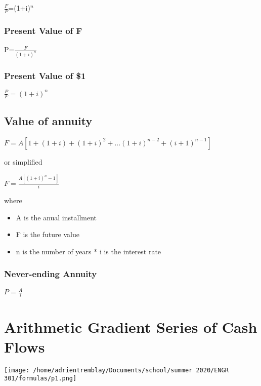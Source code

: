 \documentclass[]{article}
\providecommand{\tightlist}{%
  \setlength{\itemsep}{0pt}\setlength{\parskip}{0pt}}
\begin{document}
\(\frac{F}{P}\)=(1+i)\(^{n}\)

\hypertarget{present-value-of-f}{%
\subsubsection{Present Value of F}\label{present-value-of-f}}

P=\(\frac{F}{(1+i)^{n}}\)

\hypertarget{present-value-of-1}{%
\subsubsection{Present Value of \$1}\label{present-value-of-1}}

\(\frac{P}{F}=(1+i)^{n}\)

\hypertarget{value-of-annuity}{%
\subsection{Value of annuity}\label{value-of-annuity}}

\(F = A[1+(1+i)+(1+i)^{2} + ...(1+i)^{n-2}+(i+1)^{n-1}]\)

or simplified

\(F=\frac{A[(1+i)^{n}-1]}{i}\)

where

\begin{itemize}
\tightlist
\item
  A is the anual installment
\item
  F is the future value
\item
  n is the number of years * i is the interest rate
\end{itemize}

\hypertarget{never-ending-annuity}{%
\subsubsection{Never-ending Annuity}\label{never-ending-annuity}}

\(P=\frac{A}{i}\)

\hypertarget{arithmetic-gradient-series-of-cash-flows}{%
\section{Arithmetic Gradient Series of Cash
Flows}\label{arithmetic-gradient-series-of-cash-flows}}

\texttt{[image: /home/adrientremblay/Documents/school/summer 2020/ENGR 301/formulas/p1.png]}
\end{document}
